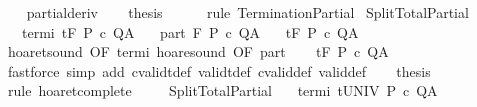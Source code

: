 \begin{isabellebody}
\ \ \isamarkupfalse%
\ partial{\isacharunderscore}deriv\isanewline
\ \ \isamarkupfalse%
\ {\isacharquery}thesis\isanewline
\ \ \ \ \isamarkupfalse%
\ {\isacharparenleft}rule\ TerminationPartial{\isacharparenright}\isanewline
{}\isamarkupfalse%
%
\endisatagproof
{\isafoldproof}%
%
\isadelimproof
\isanewline
%
\endisadelimproof
\isanewline
{}\isamarkupfalse%
\ SplitTotalPartial{\isacharcolon}\isanewline
\ \ \ termi{\isacharcolon}\ {\isachardoublequoteopen}{\isasymGamma}{\isacharcomma}{\isasymTheta}{\isasymturnstile}\isactrlsub t\isactrlbsub {\isacharslash}F\isactrlesub \ P\ c\ Q{\isacharprime}{\isacharcomma}A{\isacharprime}{\isachardoublequoteclose}\isanewline
\ \ \ part{\isacharcolon}\ {\isachardoublequoteopen}{\isasymGamma}{\isacharcomma}{\isasymTheta}{\isasymturnstile}\isactrlbsub {\isacharslash}F\isactrlesub \ P\ c\ Q{\isacharcomma}A{\isachardoublequoteclose}\isanewline
\ \ \ {\isachardoublequoteopen}{\isasymGamma}{\isacharcomma}{\isasymTheta}{\isasymturnstile}\isactrlsub t\isactrlbsub {\isacharslash}F\isactrlesub \ P\ c\ Q{\isacharcomma}A{\isachardoublequoteclose}\isanewline
%
\isadelimproof
%
\endisadelimproof
%
\isatagproof
{}\isamarkupfalse%
\ {\isacharminus}\isanewline
\ \ \isamarkupfalse%
\ hoaret{\isacharunderscore}sound\ {\isacharbrackleft}OF\ termi{\isacharbrackright}\ hoare{\isacharunderscore}sound\ {\isacharbrackleft}OF\ part{\isacharbrackright}\isanewline
\ \ \isamarkupfalse%
\ {\isachardoublequoteopen}{\isasymGamma}{\isacharcomma}{\isasymTheta}{\isasymTurnstile}\isactrlsub t\isactrlbsub {\isacharslash}F\isactrlesub \ P\ c\ Q{\isacharcomma}A{\isachardoublequoteclose}\isanewline
\ \ \ \ \isamarkupfalse%
\ {\isacharparenleft}fastforce\ simp\ add{\isacharcolon}\ cvalidt{\isacharunderscore}def\ validt{\isacharunderscore}def\ cvalid{\isacharunderscore}def\ valid{\isacharunderscore}def{\isacharparenright}\isanewline
\ \ \isamarkupfalse%
\ {\isacharquery}thesis\isanewline
\ \ \ \ \isamarkupfalse%
\ {\isacharparenleft}rule\ hoaret{\isacharunderscore}complete{\isacharprime}{\isacharparenright}\isanewline
{}\isamarkupfalse%
%
\endisatagproof
{\isafoldproof}%
%
\isadelimproof
\isanewline
%
\endisadelimproof
\ \ \ \isanewline
{}\isamarkupfalse%
\ SplitTotalPartial{\isacharprime}{\isacharcolon}\isanewline
\ \ \ termi{\isacharcolon}\ {\isachardoublequoteopen}{\isasymGamma}{\isacharcomma}{\isasymTheta}{\isasymturnstile}\isactrlsub t\isactrlbsub {\isacharslash}UNIV\isactrlesub \ P\ c\ Q{\isacharprime}{\isacharcomma}A{\isacharprime}{\isachardoublequoteclose}\isanewline

\end{isabellebody}
